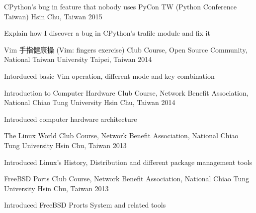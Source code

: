 \begin{cventries}
  \talkentry
    {CPython's bug in feature that nobody uses}
    {PyCon TW (Python Conference Taiwan)}
    {Hsin Chu, Taiwan}
    {2015}
    {
      \begin{cvitems}
        \item {Explain how I discover a bug in CPython's trafile module and fix it}
      \end{cvitems}
    }

  \talkentry
    {Vim 手指健康操 (Vim: fingers exercise)}
    {Club Course, Open Source Community, National Taiwan University}
    {Taipei, Taiwan}
    {2014}
    {
      \begin{cvitems}
      \item {Intorduced basic Vim operation, different mode and key combination}
      \end{cvitems}
    }

  \talkentry
    {Introduction to Computer Hardware}
    {Club Course, Network Benefit Association, National Chiao Tung University}
    {Hsin Chu, Taiwan}
    {2014}
    {
      \begin{cvitems}
        \item {Introduced computer hardware architecture}
      \end{cvitems}
    }

  \talkentry
    {The Linux World}
    {Club Course, Network Benefit Association, National Chiao Tung University}
    {Hsin Chu, Taiwan}
    {2013}
    {
      \begin{cvitems}
        \item {Introduced Linux's History, Distribution and different package management tools}
      \end{cvitems}
    }

  \talkentry
    {FreeBSD Ports}
    {Club Course, Network Benefit Association, National Chiao Tung University}
    {Hsin Chu, Taiwan}
    {2013}
    {
      \begin{cvitems}
      \item {Introduced FreeBSD Prorts System and related tools}
      \end{cvitems}
    }

\end{cventries}
